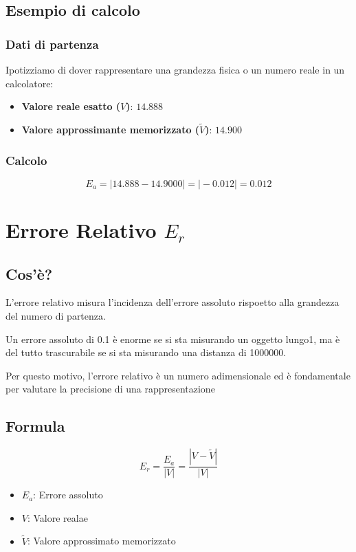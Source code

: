 \subsection{Esempio di calcolo}

\subsubsection{Dati di partenza}
Ipotizziamo di dover rappresentare una grandezza fisica o un numero reale in un calcolatore:

\begin{itemize}
    \item \textbf{Valore reale esatto ($V$)}: $14.888$
    \item \textbf{Valore approssimante memorizzato ($\tilde{V}$)}: $14.900$
\end{itemize}

\subsubsection{Calcolo}
{
    \Large

    $$
    E_a = \vert{} 14.888 - 14.9000 \vert{} = \vert{} -0.012 \vert{} = 0.012
    $$
}

\section{Errore Relativo $E_r$}
\subsection{Cos'è?}
L'errore relativo misura l'incidenza dell'errore assoluto rispoetto alla grandezza del numero di partenza.

Un errore assoluto di 0.1 è enorme se si sta misurando un oggetto lungo1, ma è del tutto trascurabile se si sta misurando una distanza di 1000000.

Per questo motivo, l'errore relativo è un numero adimensionale ed è fondamentale per valutare la precisione di una rappresentazione

\subsection{Formula}

\begin{tcolorbox}
    {
        \Large

        $$
            E_r = \frac{E_a}{|V|} = \frac{|V - \tilde{V}|}{|V|}
        $$
    }

    \begin{itemize}
        \item $E_a$: Errore assoluto
        \item $V$: Valore realae
        \item $\tilde{V}$: Valore approssimato memorizzato
    \end{itemize}
\end{tcolorbox}

